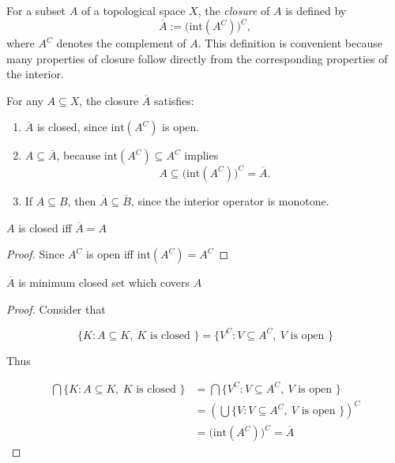 \begin{definition}[Closure]
    For a subset $A$ of a topological space $X$, the \emph{closure} of $A$ is defined by
    \[
        \overline{A} := \bigl(\mathrm{int}(A^C)\bigr)^C,
    \]
    where $A^C$ denotes the complement of $A$. This definition is convenient because
    many properties of closure follow directly from the corresponding properties of the interior.
\end{definition}

\begin{thm}
    For any $A\subseteq X$, the closure $\overline{A}$ satisfies:
    \begin{enumerate}
        \item $\overline{A}$ is closed, since $\mathrm{int}(A^C)$ is open.
        \item $A \subseteq \overline{A}$, because $\mathrm{int}(A^C)\subseteq A^C$ implies
        \[
            A \subseteq \bigl(\mathrm{int}(A^C)\bigr)^C = \overline{A}.
        \]
        \item If $A\subseteq B$, then $\overline{A}\subseteq \overline{B}$, since the interior operator is monotone.
    \end{enumerate}
\end{thm}


\begin{thm}
    $A$ is closed iff $\overline{A} = A$
\end{thm}

\begin{proof}
    Since $A^C$ is open iff $\mathrm{int}(A^C) = A^C$
\end{proof}

\begin{thm}
    $\overline{A}$ is minimum closed set which covers $A$
\end{thm}

\begin{proof}
    Consider that

    \[
        \{ K:  A \subseteq K,\: K \text{ is closed }\} = \{ V^C: V \subseteq A^C,\: V \text{ is open }\}
    \]

    Thus

    \begin{align*}
        \bigcap \{ K:  A \subseteq K,\: K \text{ is closed }\} &= \bigcap \{ V^C: V \subseteq A^C,\: V \text{ is open }\} \\
        &=  \left( \bigcup \{ V: V \subseteq A^C,\: V \text{ is open }\} \right)^C \\
        &= \bigl( \mathrm{int}(A^C) \bigr)^C = \overline{A}
    \end{align*}
\end{proof}

